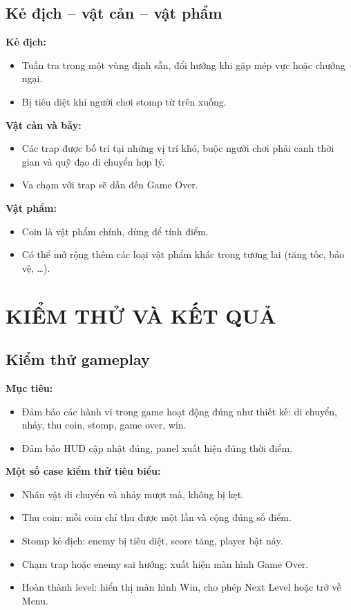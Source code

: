 \documentclass[a4paper,12pt]{article}
\begin{document}
\subsection{Kẻ địch -- vật cản -- vật phẩm}

\textbf{Kẻ địch:}
\begin{itemize}
    \item Tuần tra trong một vùng định sẵn, đổi hướng khi gặp mép vực hoặc chướng ngại.
    \item Bị tiêu diệt khi người chơi stomp từ trên xuống.
\end{itemize}

\textbf{Vật cản và bẫy:}
\begin{itemize}
    \item Các trap được bố trí tại những vị trí khó, buộc người chơi phải canh thời gian và quỹ đạo di chuyển hợp lý.
    \item Va chạm với trap sẽ dẫn đến Game Over.
\end{itemize}

\textbf{Vật phẩm:}
\begin{itemize}
    \item Coin là vật phẩm chính, dùng để tính điểm.
    \item Có thể mở rộng thêm các loại vật phẩm khác trong tương lai (tăng tốc, bảo vệ, \ldots).
\end{itemize}

\newpage

\section{KIỂM THỬ VÀ KẾT QUẢ}

\subsection{Kiểm thử gameplay}

\textbf{Mục tiêu:}
\begin{itemize}
    \item Đảm bảo các hành vi trong game hoạt động đúng như thiết kế: di chuyển, nhảy, thu coin, stomp, game over, win.
    \item Đảm bảo HUD cập nhật đúng, panel xuất hiện đúng thời điểm.
\end{itemize}

\textbf{Một số case kiểm thử tiêu biểu:}
\begin{itemize}
    \item Nhân vật di chuyển và nhảy mượt mà, không bị kẹt.
    \item Thu coin: mỗi coin chỉ thu được một lần và cộng đúng số điểm.
    \item Stomp kẻ địch: enemy bị tiêu diệt, score tăng, player bật nảy.
    \item Chạm trap hoặc enemy sai hướng: xuất hiện màn hình Game Over.
    \item Hoàn thành level: hiển thị màn hình Win, cho phép Next Level hoặc trở về Menu.
\end{itemize}
\end{document}
